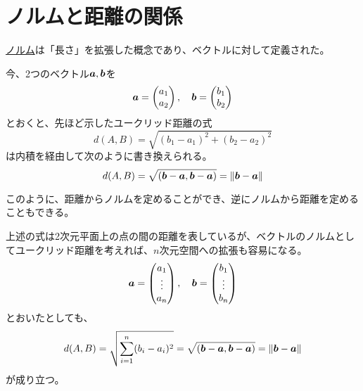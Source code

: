\documentclass[../../../topic_linear-algebra]{subfiles}
\begin{document}
\sectionline
\section{ノルムと距離の関係}

\hyperref[def:norm-axioms]{ノルム}は「長さ」を拡張した概念であり、ベクトルに対して定義された。

\br

今、2つのベクトル$\vb*{a},\vb*{b}$を
\begin{equation*}
  \vb*{a} = \begin{pmatrix} a_1 \\ a_2 \end{pmatrix}, \quad
  \vb*{b} = \begin{pmatrix} b_1 \\ b_2 \end{pmatrix}
\end{equation*}
とおくと、先ほど示したユークリッド距離の式
\begin{equation*}
  d(A,B) = \sqrt{(b_1 - a_1)^2 + (b_2 - a_2)^2}
\end{equation*}
は内積を経由して次のように書き換えられる。
\begin{equation*}
  d(A,B) = \sqrt{(\vb*{b}-\vb*{a}, \vb*{b}-\vb*{a})} = \|\vb*{b}-\vb*{a}\|
\end{equation*}

\br

このように、距離からノルムを定めることができ、逆にノルムから距離を定めることもできる。

\br

上述の式は2次元平面上の点の間の距離を表しているが、ベクトルのノルムとしてユークリッド距離を考えれば、$n$次元空間への拡張も容易になる。
\begin{equation*}
  \vb*{a} = \begin{pmatrix} a_1 \\ \vdots \\ a_n \end{pmatrix}, \quad
  \vb*{b} = \begin{pmatrix} b_1 \\ \vdots \\ b_n \end{pmatrix}
\end{equation*}
とおいたとしても、
\begin{equation*}
  d(A,B) = \sqrt{\sum_{i=1}^n (b_i - a_i)^2} = \sqrt{(\vb*{b}-\vb*{a}, \vb*{b}-\vb*{a})} = \|\vb*{b}-\vb*{a}\|
\end{equation*}
が成り立つ。
\end{document}
